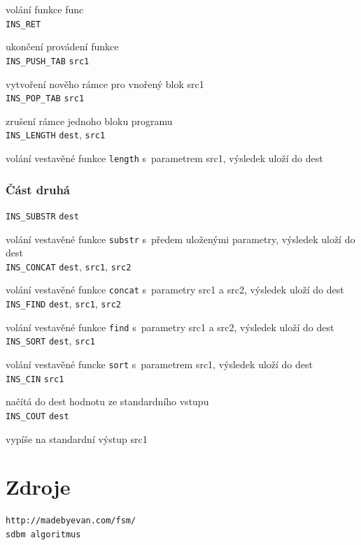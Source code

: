 \documentclass[a4paper, 12pt]{article}
\begin{document}
volání funkce func\\
\texttt{INS\_RET}

ukončení provádení funkce\\
\texttt{INS\_PUSH\_TAB} \texttt{src1}

vytvoření nověho rámce pro vnořený blok src1\\
\texttt{INS\_POP\_TAB} \texttt{src1}

zrušení rámce jednoho bloku programu\\
\texttt{INS\_LENGTH} \texttt{dest}, \texttt{src1}

volání vestavěné funkce \texttt{length} s~parametrem src1, výsledek uloží do dest\\

\newpage
\subsubsection*{Část druhá}
\texttt{INS\_SUBSTR} \texttt{dest}

volání vestavěné funkce \texttt{substr} s~předem uloženými parametry, výsledek uloží do dest\\
\texttt{INS\_CONCAT} \texttt{dest}, \texttt{src1}, \texttt{src2}

volání vestavěné funkce \texttt{concat} s~parametry src1 a src2, výsledek uloží do dest\\
\texttt{INS\_FIND} \texttt{dest}, \texttt{src1}, \texttt{src2}

volání vestavěné funkce \texttt{find} s~parametry src1 a src2, výsledek uloží do dest\\
\texttt{INS\_SORT} \texttt{dest}, \texttt{src1}

volání vestavěné funcke \texttt{sort} s~parametrem src1, výsledek uloží do dest\\
\texttt{INS\_CIN} \texttt{src1}

načítá do dest hodnotu ze standardního vstupu\\
\texttt{INS\_COUT} \texttt{dest}

vypíše na standardní výstup src1\\

\section{Zdroje}

\begin{verbatim}
http://madebyevan.com/fsm/
sdbm algoritmus
\end{verbatim}
\end{document}
